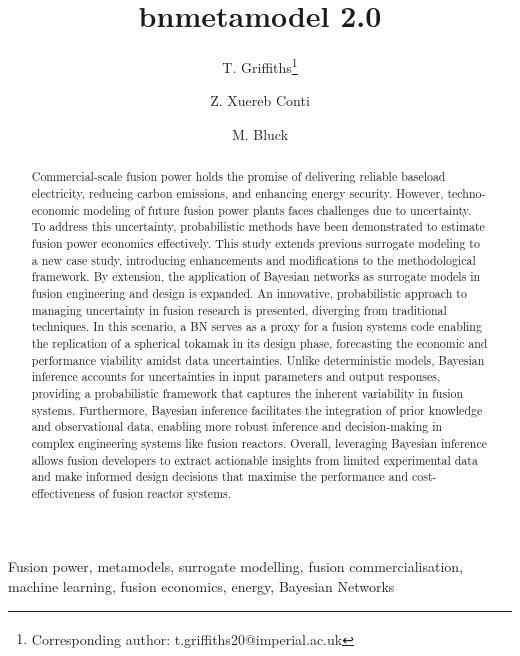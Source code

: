 \documentclass[journal]{IEEEtran}
\begin{document}
\title{bnmetamodel 2.0}

\author[1]{T. Griffiths\thanks{\textsuperscript{\Cross}Corresponding author: t.griffiths20@imperial.ac.uk}}
\author[2]{Z. Xuereb Conti}
\author[1]{M. Bluck}

\vspace{-15pt}

\maketitle

\begin{abstract}
Commercial-scale fusion power holds the promise of delivering reliable baseload electricity, reducing carbon emissions, and enhancing energy security. However, techno-economic modeling of future fusion power plants faces challenges due to uncertainty. To address this uncertainty, probabilistic methods have been demonstrated to estimate fusion power economics effectively. This study extends previous surrogate modeling to a new case study, introducing enhancements and modifications to the methodological framework. By extension, the application of Bayesian networks as surrogate models in fusion engineering and design is expanded. An innovative, probabilistic approach to managing uncertainty in fusion research is presented, diverging from traditional techniques. In this scenario, a BN serves as a proxy for a fusion systems code enabling the replication of a spherical tokamak in its design phase, forecasting the economic and performance viability amidst data uncertainties. Unlike deterministic models, Bayesian inference accounts for uncertainties in input parameters and output responses, providing a probabilistic framework that captures the inherent variability in fusion systems. Furthermore, Bayesian inference facilitates the integration of prior knowledge and observational data, enabling more robust inference and decision-making in complex engineering systems like fusion reactors. Overall, leveraging Bayesian inference allows fusion developers to extract actionable insights from limited experimental data and make informed design decisions that maximise the performance and cost-effectiveness of fusion reactor systems.
\end{abstract}

\begin{IEEEkeywords}
Fusion power, metamodels, surrogate modelling, fusion commercialisation, machine learning, fusion economics, energy, Bayesian Networks
\end{IEEEkeywords}
\vspace{-2ex}
\end{document}
